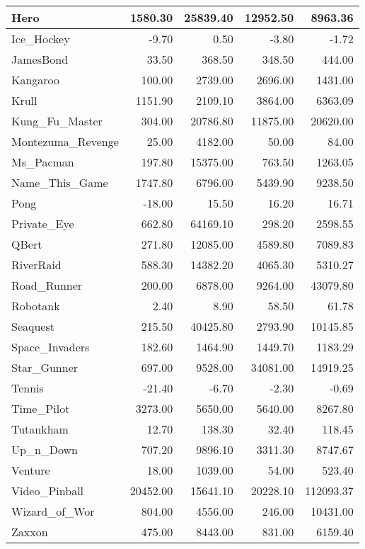 \documentclass{article}
\begin{document}
\begin{table*}[h]
\begin{tabular}{l|r|r|r|r}
		\hline
		Hero & 1580.30 & 25839.40 & 12952.50 & 8963.36 \\
		\hline
		Ice\_Hockey & -9.70 & 0.50 & -3.80 & -1.72 \\
		\hline
		JamesBond & 33.50 & 368.50 & 348.50 & 444.00 \\
		\hline
		Kangaroo & 100.00 & 2739.00 & 2696.00 & 1431.00 \\
		\hline
		Krull & 1151.90 & 2109.10 & 3864.00 & 6363.09 \\
		\hline
		Kung\_Fu\_Master & 304.00 & 20786.80 & 11875.00 & 20620.00 \\
		\hline
		Montezuma\_Revenge & 25.00 & 4182.00 & 50.00 & 84.00 \\
		\hline
		Ms\_Pacman & 197.80 & 15375.00 & 763.50 & 1263.05 \\
		\hline
		Name\_This\_Game & 1747.80 & 6796.00 & 5439.90 & 9238.50 \\
		\hline
		Pong & -18.00 & 15.50 & 16.20 & 16.71 \\
		\hline
		Private\_Eye & 662.80 & 64169.10 & 298.20 & 2598.55 \\
		\hline
		QBert & 271.80 & 12085.00 & 4589.80 & 7089.83 \\
		\hline
		RiverRaid & 588.30 & 14382.20 & 4065.30 & 5310.27 \\
		\hline
		Road\_Runner & 200.00 & 6878.00 & 9264.00 & 43079.80 \\
		\hline
		Robotank & 2.40 & 8.90 & 58.50 & 61.78 \\
		\hline
		Seaquest & 215.50 & 40425.80 & 2793.90 & 10145.85 \\
		\hline
		Space\_Invaders & 182.60 & 1464.90 & 1449.70 & 1183.29 \\
		\hline
		Star\_Gunner & 697.00 & 9528.00 & 34081.00 & 14919.25 \\
		\hline
		Tennis & -21.40 & -6.70 & -2.30 & -0.69 \\
		\hline
		Time\_Pilot & 3273.00 & 5650.00 & 5640.00 & 8267.80 \\
		\hline
		Tutankham & 12.70 & 138.30 & 32.40 & 118.45 \\
		\hline
		Up\_n\_Down & 707.20 & 9896.10 & 3311.30 & 8747.67 \\
		\hline
		Venture & 18.00 & 1039.00 & 54.00 & 523.40 \\
		\hline
		Video\_Pinball & 20452.00 & 15641.10 & 20228.10 & 112093.37 \\
		\hline
		Wizard\_of\_Wor & 804.00 & 4556.00 & 246.00 & 10431.00 \\
		\hline
		Zaxxon & 475.00 & 8443.00 & 831.00 & 6159.40 \\
		\hline
	\end{tabular}
\end{table*}
\end{document}
